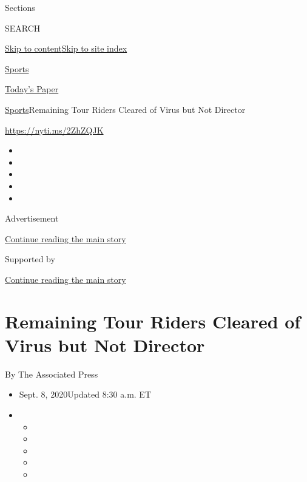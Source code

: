Sections

SEARCH

\protect\hyperlink{site-content}{Skip to
content}\protect\hyperlink{site-index}{Skip to site index}

\href{https://www.nytimes3xbfgragh.onion/section/sports}{Sports}

\href{https://myaccount.nytimes3xbfgragh.onion/auth/login?response_type=cookie\&client_id=vi}{}

\href{https://www.nytimes3xbfgragh.onion/section/todayspaper}{Today's
Paper}

\href{/section/sports}{Sports}\textbar{}Remaining Tour Riders Cleared of
Virus but Not Director

\url{https://nyti.ms/2ZhZQJK}

\begin{itemize}
\item
\item
\item
\item
\item
\end{itemize}

Advertisement

\protect\hyperlink{after-top}{Continue reading the main story}

Supported by

\protect\hyperlink{after-sponsor}{Continue reading the main story}

\hypertarget{remaining-tour-riders-cleared-of-virus-but-not-director}{%
\section{Remaining Tour Riders Cleared of Virus but Not
Director}\label{remaining-tour-riders-cleared-of-virus-but-not-director}}

By The Associated Press

\begin{itemize}
\item
  Sept. 8, 2020Updated 8:30 a.m. ET
\item
  \begin{itemize}
  \item
  \item
  \item
  \item
  \item
  \end{itemize}
\end{itemize}

